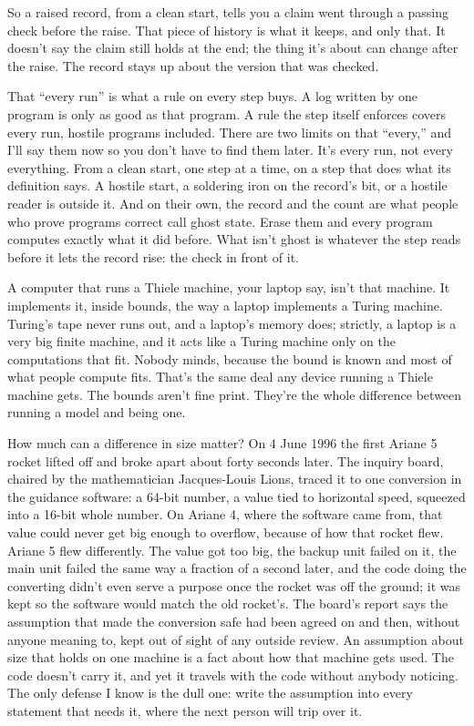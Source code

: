 \documentclass[11pt,twoside]{article}
\theoremstyle{thielethm}
\theoremstyle{thieledef}
\theoremstyle{thieledef}
\theoremstyle{thieledef}
\theoremstyle{thielethm}
\theoremstyle{thieleobs}
\theoremstyle{thielethm}
\begin{document}
So a raised record, from a clean start, tells you a claim went through a passing check before the raise. That piece of history is what it keeps, and only that. It doesn't say the claim still holds at the end; the thing it's about can change after the raise. The record stays up about the version that was checked.

That ``every run'' is what a rule on every step buys. A log written by one program is only as good as that program. A rule the step itself enforces covers every run, hostile programs included. There are two limits on that ``every,'' and I'll say them now so you don't have to find them later. It's every run, not every everything. From a clean start, one step at a time, on a step that does what its definition says. A hostile start, a soldering iron on the record's bit, or a hostile reader is outside it. And on their own, the record and the count are what people who prove programs correct call ghost state. Erase them and every program computes exactly what it did before. What isn't ghost is whatever the step reads before it lets the record rise: the check in front of it.

A computer that runs a Thiele machine, your laptop say, isn't that machine. It implements it, inside bounds, the way a laptop implements a Turing machine. Turing's tape never runs out, and a laptop's memory does; strictly, a laptop is a very big finite machine, and it acts like a Turing machine only on the computations that fit. Nobody minds, because the bound is known and most of what people compute fits. That's the same deal any device running a Thiele machine gets. The bounds aren't fine print. They're the whole difference between running a model and being one.

How much can a difference in size matter? On 4 June 1996 the first Ariane 5 rocket lifted off and broke apart about forty seconds later. The inquiry board, chaired by the mathematician Jacques-Louis Lions, traced it to one conversion in the guidance software: a 64-bit number, a value tied to horizontal speed, squeezed into a 16-bit whole number. On Ariane 4, where the software came from, that value could never get big enough to overflow, because of how that rocket flew. Ariane 5 flew differently. The value got too big, the backup unit failed on it, the main unit failed the same way a fraction of a second later, and the code doing the converting didn't even serve a purpose once the rocket was off the ground; it was kept so the software would match the old rocket's. The board's report says the assumption that made the conversion safe had been agreed on and then, without anyone meaning to, kept out of sight of any outside review. An assumption about size that holds on one machine is a fact about how that machine gets used. The code doesn't carry it, and yet it travels with the code without anybody noticing. The only defense I know is the dull one: write the assumption into every statement that needs it, where the next person will trip over it.
\end{document}
